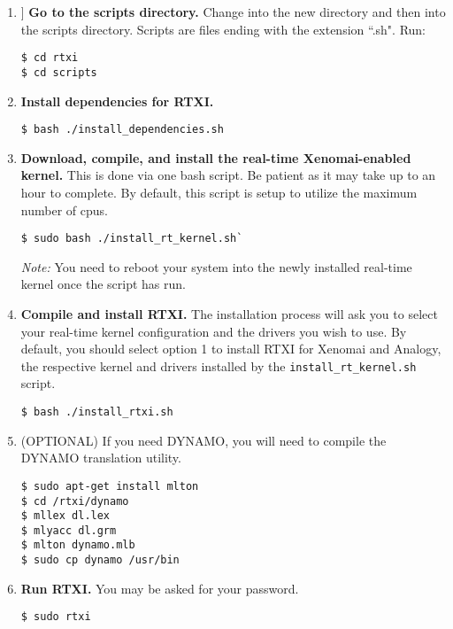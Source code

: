 \begin{enumerate}
\item ] \textbf{Go to the scripts directory.} Change into the new directory and then into the scripts directory. Scripts are files ending with the extension ``.sh". Run:

\begin{verbatim}
$ cd rtxi
$ cd scripts
\end{verbatim}

\item \textbf{Install dependencies for RTXI.}

\begin{verbatim}
$ bash ./install_dependencies.sh
\end{verbatim}

\item \textbf{Download, compile, and install the real-time Xenomai-enabled kernel.} This is done via one bash script. Be patient as it may take up to an hour to complete. By default, this script is setup to utilize the maximum number of cpus.

\begin{verbatim}
$ sudo bash ./install_rt_kernel.sh`
\end{verbatim}

\begin{comment}
When the configuration options appear, specify your processor. If your processor is not listed, choose the 'generic' option.
\end{comment}
\textit{Note:} You need to reboot your system into the newly installed real-time kernel once the script has run. 

\item \textbf{Compile and install RTXI.} The installation process will ask you to select your real-time kernel configuration and the drivers you wish to use. By default, you should select option 1 to install RTXI for Xenomai and Analogy, the respective kernel and drivers installed by the \texttt{install\_rt\_kernel.sh} script.

\begin{verbatim}
$ bash ./install_rtxi.sh
\end{verbatim}

\item (OPTIONAL) If you need DYNAMO, you will need to compile the DYNAMO translation utility.
\label{install DYNAMO}
\begin{verbatim}
$ sudo apt-get install mlton
$ cd /rtxi/dynamo
$ mllex dl.lex
$ mlyacc dl.grm
$ mlton dynamo.mlb
$ sudo cp dynamo /usr/bin
\end{verbatim}

\item \textbf{Run RTXI.} You may be asked for your password.

\begin{verbatim}
$ sudo rtxi
\end{verbatim}

\end{enumerate}